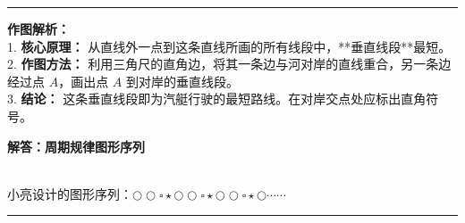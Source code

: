\vspace{1.0cm}
\hrule
\vspace{0.4cm}

{\small
\textbf{作图解析：} \\
1. \textbf{核心原理：} 从直线外一点到这条直线所画的所有线段中，**垂直线段**最短。 \\
2. \textbf{作图方法：} 利用三角尺的直角边，将其一条边与河对岸的直线重合，另一条边经过点 $A$，画出点 $A$ 到对岸的垂直线段。 \\
3. \textbf{结论：} 这条垂直线段即为汽艇行驶的最短路线。在对岸交点处应标出直角符号。
}




\newpage

\begin{center}
  {\large\bfseries 解答：周期规律图形序列}
\end{center}

\vspace{0.6cm}

\\
{\small 小亮设计的图形序列：$\bigcirc \bigcirc \square \star \bigcirc \bigcirc \square \star \bigcirc \bigcirc \square \star \bigcirc \cdots\cdots$}

\vspace{0.8cm}
\hrule
\vspace{0.5cm}

